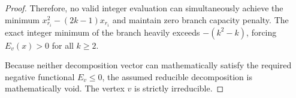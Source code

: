 \documentclass[12pt]{article}
\begin{document}
\begin{proof}
Therefore, no valid integer evaluation can simultaneously achieve the minimum $x_{r_i}^2 - (2k-1)x_{r_i}$ and maintain zero branch capacity penalty. The exact integer minimum of the branch heavily exceeds $-(k^2-k)$, forcing $E_v(x) > 0$ for all $k \ge 2$. 

Because neither decomposition vector can mathematically satisfy the required negative functional $E_v \le 0$, the assumed reducible decomposition is mathematically void. The vertex $v$ is strictly irreducible.
\end{proof}
\end{document}
